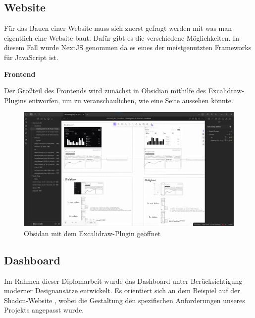 \begin{inhalt}
\renewcommand*\chapterpagestyle{scrheadings}

\section{Website}

Für das Bauen einer Website muss sich zuerst gefragt werden mit was man eigentlich eine Website baut. Dafür gibt es die verschiedene Möglichkeiten. In diesem Fall wurde NextJS genommen da es eines der meistgenutzten Frameworks \cite{SurveyStackOverflow} für JavaScript ist.

\vspace{1cm}

\textbf{Frontend}

Der Großteil des Frontends wird zunächst in Obsidian mithilfe des Excalidraw-Plugins entworfen, um zu veranschaulichen, wie eine Seite aussehen könnte.

\begin{figure}[!htb] 
\centering 
\includegraphics[width=1\textwidth]{files/Thomas/pics/Design-Grundlagen/image.png} 
\caption[Obsidan mit dem Excalidraw-Plugin geöffnet]{Obsidan mit dem Excalidraw-Plugin geöffnet} 
\label{fig:gehaeuse_internet_bild} 
\end{figure}

\newpage
\subsection{Dashboard}

Im Rahmen dieser Diplomarbeit wurde das Dashboard unter Berücksichtigung moderner Designansätze entwickelt. Es orientiert sich an dem Beispiel auf der Shadcn-Website \cite{ShadCNDashboard}, wobei die Gestaltung den spezifischen Anforderungen unseres Projekts angepasst wurde.


\end{inhalt}
